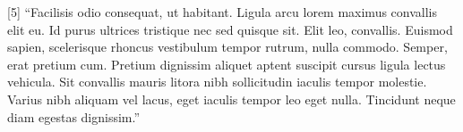 \documentclass[
  12pt,
]{article}
\begin{document}
{[}5{]} ``Facilisis odio consequat, ut habitant. Ligula arcu lorem maximus convallis elit eu. Id purus ultrices tristique nec sed quisque sit. Elit leo, convallis. Euismod sapien, scelerisque rhoncus vestibulum tempor rutrum, nulla commodo. Semper, erat pretium cum. Pretium dignissim aliquet aptent suscipit cursus ligula lectus vehicula. Sit convallis mauris litora nibh sollicitudin iaculis tempor molestie. Varius nibh aliquam vel lacus, eget iaculis tempor leo eget nulla. Tincidunt neque diam egestas dignissim.''
\end{document}
